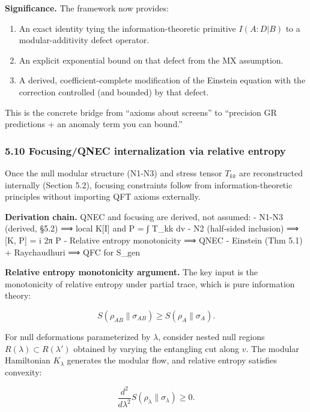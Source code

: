 \documentclass[
]{article}
\providecommand{\tightlist}{%
  \setlength{\itemsep}{0pt}\setlength{\parskip}{0pt}}
\begin{document}
\textbf{Significance.} The framework now provides:

\begin{enumerate}
\def\labelenumi{\arabic{enumi}.}
\tightlist
\item
  An exact identity tying the information-theoretic primitive
  \(I(A:D|B)\) to a modular-additivity defect operator.
\item
  An explicit exponential bound on that defect from the MX assumption.
\item
  A derived, coefficient-complete modification of the Einstein equation
  with the correction controlled (and bounded) by that defect.
\end{enumerate}

This is the concrete bridge from ``axioms about screens'' to ``precision
GR predictions + an anomaly term you can bound.''

\subsubsection{5.10 Focusing/QNEC internalization via relative
entropy}\label{focusingqnec-internalization-via-relative-entropy}

Once the null modular structure (N1-N3) and stress tensor \(T_{kk}\) are
reconstructed internally (Section 5.2), focusing constraints follow from
information-theoretic principles without importing QFT axioms
externally.

\textbf{Derivation chain.} QNEC and focusing are derived, not assumed: -
N1-N3 (derived, §5.2) ⟹ local K{[}I{]} and P = ∫ T\_kk dv - N2
(half-sided inclusion) ⟹ {[}K, P{]} = i 2π P - Relative entropy
monotonicity ⟹ QNEC - Einstein (Thm 5.1) + Raychaudhuri ⟹ QFC for S\_gen

\textbf{Relative entropy monotonicity argument.} The key input is the
monotonicity of relative entropy under partial trace, which is pure
information theory:

\[
S(\rho_{AB} \| \sigma_{AB}) \ge S(\rho_A \| \sigma_A).
\]

For null deformations parameterized by \(\lambda\), consider nested null
regions \(R(\lambda) \subset R(\lambda')\) obtained by varying the
entangling cut along \(v\). The modular Hamiltonian \(K_\lambda\)
generates the modular flow, and relative entropy satisfies convexity:

\[
\frac{d^2}{d\lambda^2} S(\rho_\lambda \| \sigma_\lambda) \ge 0.
\]
\end{document}
